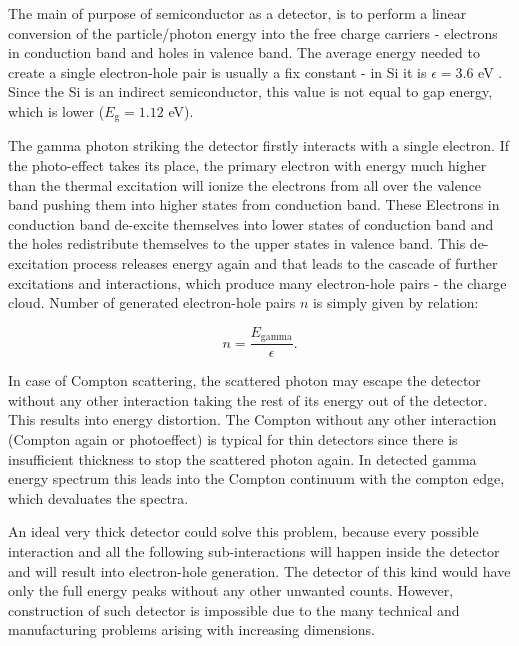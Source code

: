 \par
The main of purpose of semiconductor as a detector, is to perform a linear conversion of the particle/photon energy into the free charge carriers - electrons in conduction band and holes in valence band. The average energy needed to create a single electron-hole pair is usually a fix constant - in Si it is $\epsilon = 3.6$ eV \cite{Lutz_2007}. Since the Si is an indirect semiconductor, this value is not equal to gap energy, which is lower ($E_{\textrm{g}} = 1.12$ eV).  

\par
The gamma photon striking the detector firstly interacts with a single electron. If the photo-effect takes its place, the primary electron with energy much higher than the thermal excitation will ionize the electrons from all over the valence band pushing them into higher states from conduction band. These Electrons in conduction band de-excite themselves into lower states of conduction band and the holes redistribute themselves to the upper states in valence band. This de-excitation process releases energy again and that leads to the cascade of further excitations and interactions, which produce many electron-hole pairs - the charge cloud. Number of generated electron-hole pairs $n$ is simply given by relation:


\begin{equation}
n = \frac{E_{\textrm{gamma}}}{\epsilon}.
\end{equation}

\par
In case of Compton scattering, the scattered photon may escape the detector without any other interaction taking the rest of its energy out of the detector. This results into energy distortion. The Compton without any other interaction (Compton again or photoeffect) is typical for thin detectors since there is insufficient thickness to stop the scattered photon again. In detected gamma energy spectrum this leads into the Compton continuum with the compton edge, which devaluates the spectra.

\par
An ideal very thick detector could solve this problem, because every possible interaction and all the following sub-interactions will happen inside the detector and will result into electron-hole generation. The detector of this kind would have only the full energy peaks without any other unwanted counts. However, construction of such detector is impossible due to the many technical and manufacturing problems arising with increasing dimensions. 


